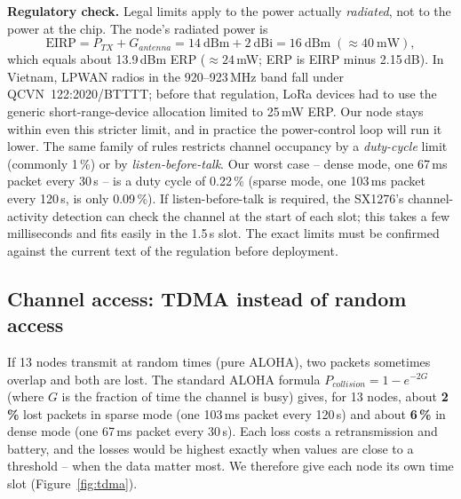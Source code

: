 \documentclass[11pt,a4paper]{report}
\begin{document}
\textbf{Regulatory check.} Legal limits apply to the power actually \emph{radiated}, not to the power at the chip. The node's radiated power is
\begin{equation}
  \text{EIRP} = P_{TX} + G_{antenna} = 14\ \text{dBm} + 2\ \text{dBi} = 16\ \text{dBm} \;(\approx 40\ \text{mW}),
\end{equation}
which equals about 13.9\,dBm ERP ($\approx 24$\,mW; ERP is EIRP minus 2.15\,dB). In Vietnam, LPWAN radios in the 920--923\,MHz band fall under QCVN~122:2020/BTTTT; before that regulation, LoRa devices had to use the generic short-range-device allocation limited to 25\,mW ERP. Our node stays within even this stricter limit, and in practice the power-control loop will run it lower. The same family of rules restricts channel occupancy by a \emph{duty-cycle} limit (commonly 1\,\%) or by \emph{listen-before-talk}. Our worst case -- dense mode, one 67\,ms packet every 30\,s -- is a duty cycle of 0.22\,\% (sparse mode, one 103\,ms packet every 120\,s, is only 0.09\,\%). If listen-before-talk is required, the SX1276's channel-activity detection can check the channel at the start of each slot; this takes a few milliseconds and fits easily in the 1.5\,s slot. The exact limits must be confirmed against the current text of the regulation before deployment.

\subsection{Channel access: TDMA instead of random access}
If 13 nodes transmit at random times (pure ALOHA), two packets sometimes overlap and both are lost. The standard ALOHA formula $P_{collision} = 1 - e^{-2G}$ (where $G$ is the fraction of time the channel is busy) gives, for 13 nodes, about \textbf{2\,\%} lost packets in sparse mode (one 103\,ms packet every 120\,s) and about \textbf{6\,\%} in dense mode (one 67\,ms packet every 30\,s). Each loss costs a retransmission and battery, and the losses would be highest exactly when values are close to a threshold -- when the data matter most. We therefore give each node its own time slot (Figure~\ref{fig:tdma}).
\end{document}
